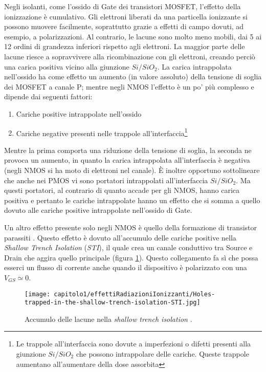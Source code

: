 Negli isolanti, come l'ossido di Gate dei transistori MOSFET, l'effetto della ionizzazione è cumulativo. Gli elettroni liberati da una particella ionizzante si possono muovere facilmente, soprattutto grazie a effetti di campo dovuti, ad esempio, a polarizzazioni.
Al contrario, le lacune sono molto meno mobili, dai 5 ai 12 ordini di grandezza inferiori rispetto agli elettroni. La maggior parte delle lacune riesce a sopravvivere alla ricombinazione con gli elettroni, creando perciò una carica positiva vicino alla giunzione $Si/SiO_2$.
La carica intrappolata nell'ossido ha come effetto un aumento (in valore assoluto) della tensione di soglia dei MOSFET a canale P; mentre negli NMOS l'effetto è un po' più complesso e dipende dai seguenti fattori:
\begin{enumerate}
	\item Cariche positive intrappolate nell'ossido
	\item Cariche negative presenti nelle trappole all'interfaccia\footnote{Le trappole all'interfaccia sono dovute a imperfezioni o difetti presenti alla giunzione $Si/SiO_2$ che possono intrappolare delle cariche. Queste trappole aumentano all'aumentare della dose assorbita}
\end{enumerate}
Mentre la prima comporta una riduzione della tensione di soglia, la seconda ne provoca un aumento, in quanto la carica intrappolata all'interfaccia è negativa (negli NMOS si ha moto di elettroni nel canale). 
È inoltre opportuno sottolineare che anche nei PMOS vi sono portatori intrappolati all'interfaccia $Si/SiO_2$. Ma questi portatori, al contrario di quanto accade per gli NMOS, hanno carica positiva e pertanto le cariche intrappolate hanno un effetto che si somma a quello dovuto alle cariche positive intrappolate nell'ossido di Gate.  

\vspace{0.5cm}

Un altro effetto presente solo negli NMOS è quello della formazione di transistor parassiti \cite{effetti_radiazioni:CMOS_IC_radiation_hardening_by_design}. Questo effetto è dovuto all'accumulo delle cariche positive nella \textit{Shallow Trench Isolation} (\textit{STI}), il quale crea un canale conduttivo tra Source e Drain che aggira quello principale (figura \ref{fig:accumulo_lacune_STI}). Questo collegamento fa sì che possa esserci un flusso di corrente anche quando il dispositivo è polarizzato con una $V_{GS} \simeq 0$.

\begin{figure}[ht]
	\centering

	\texttt{[image: capitolo1/effettiRadiazioniIonizzanti/Holes-trapped-in-the-shallow-trench-isolation-STI.jpg]}

	\caption[Lacune nella \textit{STI}]{Accumulo delle lacune nella \textit{shallow trench isolation} \cite{effetti_radiazioni:CMOS_IC_radiation_hardening_by_design}.}
	\label{fig:accumulo_lacune_STI}

\end{figure}

